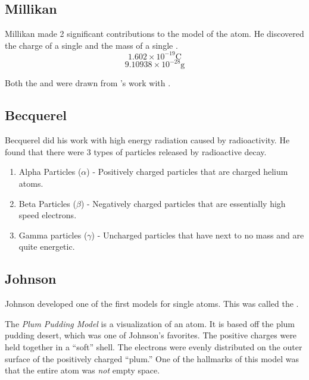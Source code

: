 \subsection{Millikan} \label{subsec:Millikan}
Millikan made 2 significant contributions to the model of the atom.
He discovered the charge of a single  and the mass of a single .
\begin{equation} \label{eq:Electron Charge}
  1.602 \times 10^{-19} \si{\coulomb}
\end{equation}
\begin{equation} \label{eq:Electron Mass}
  9.10938 \times 10^{-28} \si{\gram}
\end{equation}

Both the  and  were drawn from 's work with .

\subsection{Becquerel} \label{subsec:Becquerel}
Becquerel did his work with high energy radiation caused by radioactivity.
He found that there were 3 types of particles released by radioactive decay.
\begin{enumerate}
  \item Alpha Particles ($\alpha$) - Positively charged particles that are charged helium atoms.
  \item Beta Particles ($\beta$) - Negatively charged particles that are essentially high speed electrons.
  \item Gamma particles ($\gamma$) - Uncharged particles that have next to no mass and are quite energetic.
\end{enumerate}

\subsection{Johnson} \label{subsec:Johnson}
Johnson developed one of the first models for single atoms.
This was called the .

\begin{definition} \label{def:Plum Pudding Model}
  The \emph{Plum Pudding Model} is a visualization of an atom.
  It is based off the plum pudding desert, which was one of Johnson's favorites.
  The positive charges were held together in a ``soft'' shell.
  The electrons were evenly distributed on the outer surface of the positively charged ``plum.''
  One of the hallmarks of this model was that the entire atom was \emph{not} empty space.
\end{definition}

